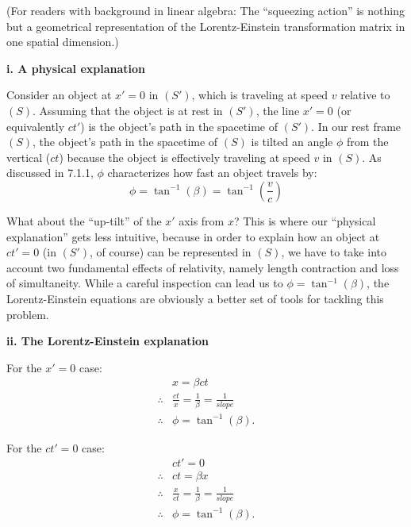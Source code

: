 \documentclass[a4paper,11pt]{article}
\numberwithin{equation}{section}
\begin{document}
\noindent (For readers with background in linear algebra: The ``squeezing action'' is nothing but a geometrical representation of the Lorentz-Einstein transformation matrix in one spatial dimension.)

\noindent \textbf{i. A physical explanation}

\noindent Consider an object at $x'=0$ in $(S')$, which is traveling at speed $v$ relative to $(S)$. Assuming that the object is at rest in $(S')$, the line $x'=0$ (or equivalently  $ct'$) is the object's path in the spacetime of $(S')$. In our rest frame $(S)$, the object's path in the spacetime of $(S)$ is tilted an angle $\phi$ from the vertical ($ct$) because the object is effectively traveling at speed $v$ in $(S)$. As discussed in 7.1.1, $\phi$ characterizes how fast an object travels by:
\begin{equation}
\phi=\tan^{-1}(\beta)=\tan^{-1}\left( \frac{v}{c}\right) 
\end{equation}  

\noindent What about the ``up-tilt'' of the $x'$ axis from $x$? This is where our ``physical explanation'' gets less intuitive, because in order to explain how an object at $ct'=0$ (in $(S')$, of course) can be represented in $(S)$, we have to take into account two fundamental effects of relativity, namely length contraction and loss of simultaneity. While a careful inspection can lead us to $\phi=\tan^{-1}(\beta)$, the Lorentz-Einstein equations are obviously a better set of tools for tackling this problem. 

\noindent \textbf{ii. The Lorentz-Einstein explanation}

\noindent For the $x'=0$ case:
\begin{equation}
\begin{split}
&x=\beta ct\\
\therefore{}& \frac{ct}{x}=\frac{1}{\beta}=\frac{1}{slope}\\
\therefore{}& \phi=\tan^{-1}(\beta).
\end{split}
\end{equation}

\noindent For the $ct'=0$ case:
\begin{equation}
\begin{split}
& ct'=0\\
\therefore{}& ct=\beta x\\
\therefore{}& \frac{x}{ct}=\frac{1}{\beta}=\frac{1}{slope}\\
\therefore{}& \phi=\tan^{-1}(\beta).
\end{split}
\end{equation}
\end{document}
